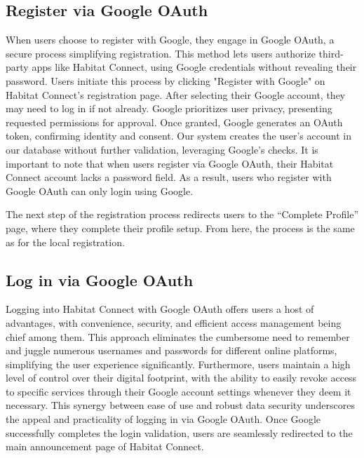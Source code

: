\documentclass[conference]{IEEEtran}
\begin{document}
\subsection{Register via Google OAuth}
When users choose to register with Google, they engage in Google OAuth, a secure process simplifying registration. This method lets users authorize third-party apps like Habitat Connect, using Google credentials without revealing their password. Users initiate this process by clicking "Register with Google" on Habitat Connect's registration page. After selecting their Google account, they may need to log in if not already. Google prioritizes user privacy, presenting requested permissions for approval. Once granted, Google generates an OAuth token, confirming identity and consent. Our system creates the user's account in our database without further validation, leveraging Google's checks. It is important to note that when users register via Google OAuth, their Habitat Connect account lacks a password field. As a result, users who register with Google OAuth can only login using Google.

The next step of the registration process redirects users to the “Complete Profile” page, where they complete their profile setup. From here, the process is the same as for the local registration.

\subsection{Log in via Google OAuth}
Logging into Habitat Connect with Google OAuth offers users a host of advantages, with convenience, security, and efficient access management being chief among them. This approach eliminates the cumbersome need to remember and juggle numerous usernames and passwords for different online platforms, simplifying the user experience significantly. Furthermore, users maintain a high level of control over their digital footprint, with the ability to easily revoke access to specific services through their Google account settings whenever they deem it necessary. This synergy between ease of use and robust data security underscores the appeal and practicality of logging in via Google OAuth. Once Google successfully completes the login validation, users are seamlessly redirected to the main announcement page of Habitat Connect.
\end{document}
